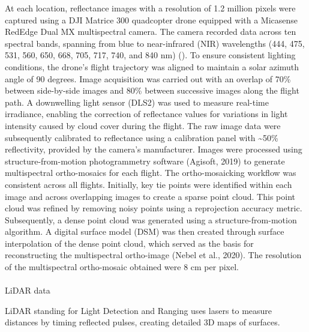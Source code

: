 \documentclass[
  letterpaper,
  DIV=11,
  numbers=noendperiod]{scrartcl}
\makeatletter
\let\oldparagraph\paragraph
\renewcommand{\paragraph}{
    \@ifstar
      \xxxParagraphStar
      \xxxParagraphNoStar
  }
\newcommand{\xxxParagraphStar}[1]{\oldparagraph*{#1}\mbox{}}
\newcommand{\xxxParagraphNoStar}[1]{\oldparagraph{#1}\mbox{}}
\makeatother
\begin{document}
At each location, reflectance images with a resolution of 1.2 million
pixels were captured using a DJI Matrice 300 quadcopter drone equipped
with a Micasense RedEdge Dual MX multispectral camera. The camera
recorded data across ten spectral bands, spanning from blue to
near-infrared (NIR) wavelengths (444, 475, 531, 560, 650, 668, 705, 717,
740, and 840 nm) (). To ensure consistent lighting conditions, the
drone's flight trajectory was aligned to maintain a solar azimuth angle
of 90 degrees. Image acquisition was carried out with an overlap of 70\%
between side-by-side images and 80\% between successive images along the
flight path. A downwelling light sensor (DLS2) was used to measure
real-time irradiance, enabling the correction of reflectance values for
variations in light intensity caused by cloud cover during the flight.
The raw image data were subsequently calibrated to reflectance using a
calibration panel with \textasciitilde50\% reflectivity, provided by the
camera's manufacturer. Images were processed using structure-from-motion
photogrammetry software (Agisoft, 2019) to generate multispectral
ortho-mosaics for each flight. The ortho-mosaicking workflow was
consistent across all flights. Initially, key tie points were identified
within each image and across overlapping images to create a sparse point
cloud. This point cloud was refined by removing noisy points using a
reprojection accuracy metric. Subsequently, a dense point cloud was
generated using a structure-from-motion algorithm. A digital surface
model (DSM) was then created through surface interpolation of the dense
point cloud, which served as the basis for reconstructing the
multispectral ortho-image (Nebel et al., 2020). The resolution of the
multispectral ortho-mosaic obtained were 8 cm per pixel.

\paragraph{LiDAR data}\label{lidar-data}

LiDAR standing for Light Detection and Ranging uses lasers to measure
distances by timing reflected pulses, creating detailed 3D maps of
surfaces.
\end{document}
